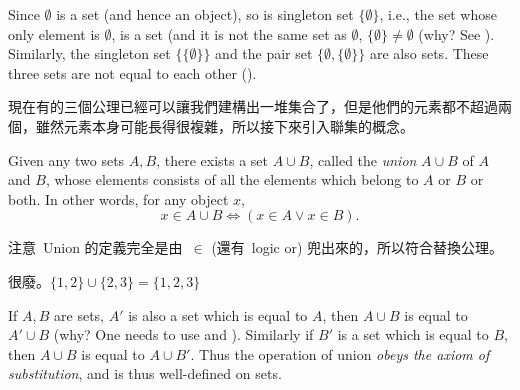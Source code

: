 \begin{example} \label{example 3.1.10}
Since \(\emptyset\) is a set (and hence an object), so is singleton set \(\{ \emptyset \}\), i.e., the set whose only element is \( \emptyset \), is a set (and it is not the same set as \( \emptyset \), \( \{ \emptyset \} \neq  \emptyset \) (why? See ).
Similarly, the singleton set \( \{ \{ \emptyset \} \} \) and the pair set \( \{ \emptyset, \{ \emptyset \} \} \) are also sets.
These three sets are not equal to each other ().
\end{example}

\begin{note}
現在有的三個公理已經可以讓我們建構出一堆集合了，但是他們的元素都不超過兩個，雖然元素本身可能長得很複雜，所以接下來引入聯集的概念。
\end{note}

\begin{axiom}  \label{axm 3.4}
Given any two sets \(A, B\), there exists a set \(A \cup B\), called the \emph{union} \(A \cup B\) of \(A\) and \(B\), whose elements consists of all the elements which belong to \(A\) or \(B\) or both. In other words, for any object \(x\),
\[
    x \in A \cup B \iff (x \in A \lor x \in B).
\]
\end{axiom}

\begin{note}
注意\ Union 的定義完全是由\ \( \in \) (還有\ logic or) 兜出來的，所以符合替換公理。
\end{note}

\begin{example}
很廢。\( \{1, 2\} \cup \{ 2, 3 \} = \{ 1, 2, 3 \} \)
\end{example}

\begin{remark} \label{remark 3.1.12}
If \(A, B\) are sets, \(A'\) is also a set which is equal to \(A\), then \(A \cup B\) is equal to \(A' \cup B\) (why?  One needs to use  and ). 
Similarly if \(B'\) is a set which is equal to \(B\), then \(A \cup B\) is equal to \(A \cup B'\).
Thus the operation of union \emph{obeys the axiom of substitution}, and is thus well-defined on sets.
\end{remark}

